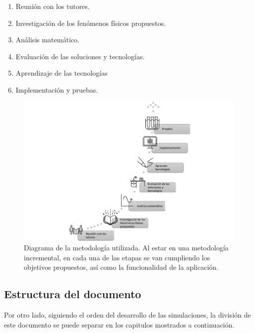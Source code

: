 \documentclass[../main.tex]{subfiles}
\begin{document}
\begin{enumerate}
    \item Reunión con los tutores.
    \item Investigación de los fenómenos físicos propuestos.
    \item Análisis matemático.
    \item Evaluación de las soluciones y tecnologías.
    \item Aprendizaje de las tecnologías 
    \item Implementación y pruebas.
\end{enumerate}

\begin{figure}[!h]
    \centering
    \includegraphics{images/Figura1.2.png}
    \caption{Diagrama de la metodología utilizada. Al estar en una metodología incremental, en cada una de las etapas se van cumpliendo los objetivos propuestos, así como la funcionalidad de la aplicación.}
    \label{fig:1.2}
\end{figure}


\subsection{Estructura del documento}
Por otro lado, siguiendo el orden del desarrollo de las simulaciones, la división de este documento se puede separar en los capitulos mostrados a continuación.
\end{document}
